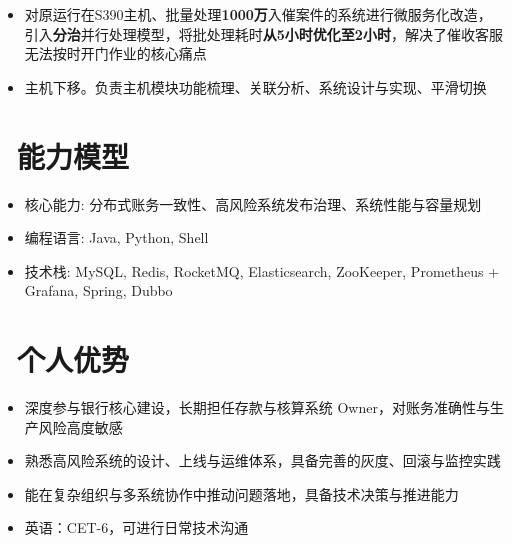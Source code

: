 \documentclass{resume}
\begin{document}
\begin{onehalfspacing}
\begin{itemize}
  \item 对原运行在S390主机、批量处理\textbf{1000万}入催案件的系统进行微服务化改造，引入\textbf{分治}并行处理模型，将批处理耗时\textbf{从5小时优化至2小时}，解决了催收客服无法按时开门作业的核心痛点
  \item 主机下移。负责主机模块功能梳理、关联分析、系统设计与实现、平滑切换
\end{itemize}
\end{onehalfspacing}


\section{\faCogs\ 能力模型}
\begin{itemize}[parsep=0.5ex]
  \item 核心能力: 分布式账务一致性、高风险系统发布治理、系统性能与容量规划
  \item 编程语言: Java, Python, Shell
  \item 技术栈: MySQL, Redis, RocketMQ, Elasticsearch, ZooKeeper, Prometheus + Grafana, Spring, Dubbo
\end{itemize}

\section{\faInfo\ 个人优势}
\begin{itemize}
  \item 深度参与银行核心建设，长期担任存款与核算系统 Owner，对账务准确性与生产风险高度敏感
  \item 熟悉高风险系统的设计、上线与运维体系，具备完善的灰度、回滚与监控实践
  \item 能在复杂组织与多系统协作中推动问题落地，具备技术决策与推进能力
  \item 英语：CET-6，可进行日常技术沟通
\end{itemize}

%
%
\end{document}

